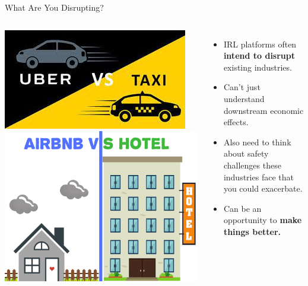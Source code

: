 \documentclass[nobackground,dvipsnames,table,aspectratio=169]{beamer}
\begin{document}
\begin{frame}{What Are You Disrupting?}
    \begin{columns}
            \includegraphics[width=\textwidth]{uber-vs-taxi}
            \includegraphics[width=\textwidth]{airbnb-vs-hotel}
            \begin{itemize}
                \item IRL platforms often \textbf{intend to disrupt} existing industries.
                \item Can’t just understand downstream economic effects.
                \item Also need to think about safety challenges these industries face that you could exacerbate.
                \item Can be an opportunity to \textbf{make things better.}
            \end{itemize}
    \end{columns}
\end{frame}
\end{document}
